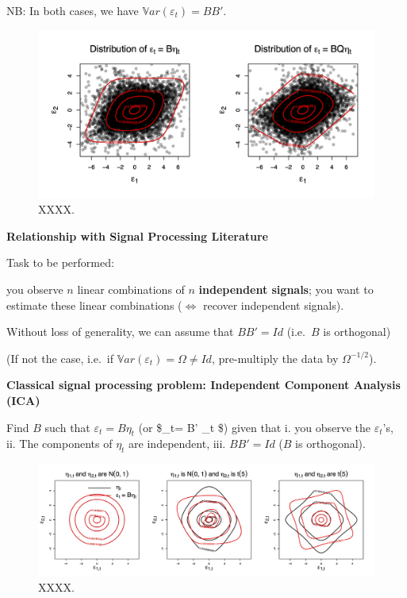 \documentclass[
]{book}
\theoremstyle{definition}
\theoremstyle{definition}
\theoremstyle{definition}
\theoremstyle{definition}
\theoremstyle{remark}
\begin{document}
NB: In both cases, we have \(\mathbb{V}ar(\varepsilon_t)=BB'\).

\begin{figure}
\includegraphics[width=0.95\linewidth]{images/Figure_D} \caption{XXXX.}\label{fig:preMadeFigureICAStudentStudent}
\end{figure}

\textbf{Relationship with Signal Processing Literature}

Task to be performed:

you observe \(n\) linear combinations of \(n\) \textbf{independent signals}; you want to estimate these linear combinations (\(\Leftrightarrow\) recover independent signals).

Without loss of generality, we can assume that \(BB' = Id\) (i.e.~\(B\) is orthogonal)

(If not the case, i.e.~if \(\mathbb{V}ar(\varepsilon_t)=\Omega \ne Id\), pre-multiply the data by \(\Omega^{-1/2}\)).

\textbf{Classical signal processing problem: Independent Component Analysis (ICA)}

Find \(B\) such that \(\varepsilon_t = B \eta_t\) (or \$\eta\_t= B' \varepsilon\_t \$) given that
i. you observe the \(\varepsilon_t\)'s,
ii. The components of \(\eta_t\) are independent,
iii. \(BB'=Id\) (\(B\) is orthogonal).

\begin{figure}
\includegraphics[width=0.95\linewidth]{images/Figure_E} \caption{XXXX.}\label{fig:ThreePlots}
\end{figure}
\end{document}
